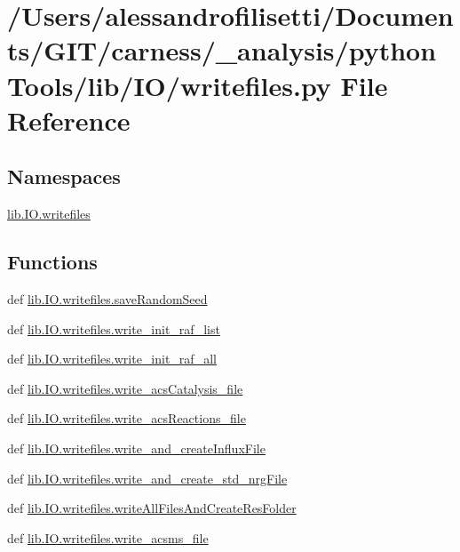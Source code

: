 \hypertarget{a00094}{\section{/\+Users/alessandrofilisetti/\+Documents/\+G\+I\+T/carness/\+\_\+analysis/python\+Tools/lib/\+I\+O/writefiles.py File Reference}
\label{a00094}
}
\subsection*{Namespaces}
\begin{DoxyCompactItemize}
\item 
 \hyperlink{a00147}{lib.\+I\+O.\+writefiles}
\end{DoxyCompactItemize}
\subsection*{Functions}
\begin{DoxyCompactItemize}
\item 
def \hyperlink{a00147_a7fddc2c2879e8fedd8fbb345a19aa6f6}{lib.\+I\+O.\+writefiles.\+save\+Random\+Seed}
\item 
def \hyperlink{a00147_a33a9a95566de3841055c5dbf7fdc3505}{lib.\+I\+O.\+writefiles.\+write\+\_\+init\+\_\+raf\+\_\+list}
\item 
def \hyperlink{a00147_ad13fc2e762b8deaeb661f939e26e706f}{lib.\+I\+O.\+writefiles.\+write\+\_\+init\+\_\+raf\+\_\+all}
\item 
def \hyperlink{a00147_af18d8f2d2d0fc78ca4418866631f347b}{lib.\+I\+O.\+writefiles.\+write\+\_\+acs\+Catalysis\+\_\+file}
\item 
def \hyperlink{a00147_adbff7889ebd8786ecf5791e8a7b00d59}{lib.\+I\+O.\+writefiles.\+write\+\_\+acs\+Reactions\+\_\+file}
\item 
def \hyperlink{a00147_ae2842322fe821ae86172affce98f3aa1}{lib.\+I\+O.\+writefiles.\+write\+\_\+and\+\_\+create\+Influx\+File}
\item 
def \hyperlink{a00147_a395b3244d381850f60bf1ee95dbe84dd}{lib.\+I\+O.\+writefiles.\+write\+\_\+and\+\_\+create\+\_\+std\+\_\+nrg\+File}
\item 
def \hyperlink{a00147_a57622287d0b21cb0fe09d15345277c5c}{lib.\+I\+O.\+writefiles.\+write\+All\+Files\+And\+Create\+Res\+Folder}
\item 
def \hyperlink{a00147_a593c166784723a06f4f6a1a96890aa17}{lib.\+I\+O.\+writefiles.\+write\+\_\+acsms\+\_\+file}
\end{DoxyCompactItemize}
